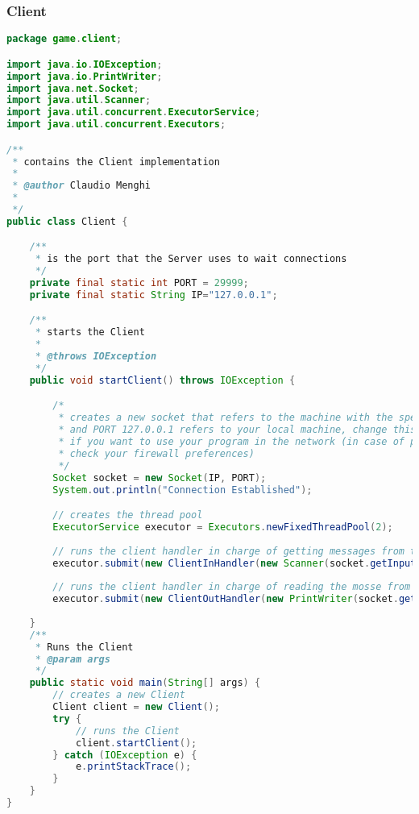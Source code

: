 \documentclass{article}
\begin{document}
\subsubsection{Client}
\begin{lstlisting}[language=Java,escapechar=|]
package game.client;

import java.io.IOException;
import java.io.PrintWriter;
import java.net.Socket;
import java.util.Scanner;
import java.util.concurrent.ExecutorService;
import java.util.concurrent.Executors;

/**
 * contains the Client implementation
 * 
 * @author Claudio Menghi
 * 
 */
public class Client {

	/**
	 * is the port that the Server uses to wait connections
	 */
	private final static int PORT = 29999;
	private final static String IP="127.0.0.1";

	/**
	 * starts the Client
	 * 
	 * @throws IOException
	 */
	public void startClient() throws IOException {

		/*
		 * creates a new socket that refers to the machine with the specified IP
		 * and PORT 127.0.0.1 refers to your local machine, change this address
		 * if you want to use your program in the network (in case of problems
		 * check your firewall preferences)
		 */
		Socket socket = new Socket(IP, PORT);
		System.out.println("Connection Established");

		// creates the thread pool
		ExecutorService executor = Executors.newFixedThreadPool(2);
		
		// runs the client handler in charge of getting messages from the server
		executor.submit(new ClientInHandler(new Scanner(socket.getInputStream())));
		
		// runs the client handler in charge of reading the mosse from the command line and sending it to the server
		executor.submit(new ClientOutHandler(new PrintWriter(socket.getOutputStream())));
		
	}
	/**
	 * Runs the Client 
	 * @param args
	 */
	public static void main(String[] args) {
		// creates a new Client
		Client client = new Client();
		try {
			// runs the Client
			client.startClient();
		} catch (IOException e) {
			e.printStackTrace();
		}
	}
}
\end{lstlisting}
\end{document}
